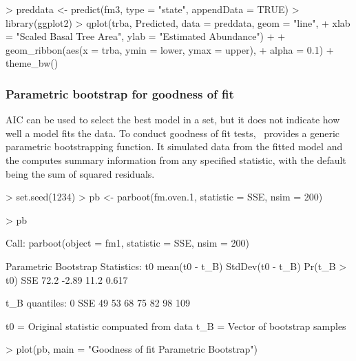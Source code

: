 \documentclass[article,shortnames]{jss}
\newcommand{\um}{\pkg{unmarked}}
\begin{document}
\begin{Schunk}
\begin{Sinput}
> preddata <- predict(fm3, type = "state", appendData = TRUE)
> library(ggplot2)
> qplot(trba, Predicted, data = preddata, geom = "line", 
+     xlab = "Scaled Basal Tree Area", ylab = "Estimated Abundance") + 
+     geom_ribbon(aes(x = trba, ymin = lower, ymax = upper), 
+         alpha = 0.1) + theme_bw()
\end{Sinput}
\end{Schunk}



\subsubsection{Parametric bootstrap for goodness of fit}

AIC can be used to select the best model in a set, but it does not indicate
how well a model fits the data.  
To conduct goodness of fit tests, \um\ provides a generic
parametric bootstrapping function.  It simulated data from the fitted
model and the computes summary information from any specified
statistic, with the default being the sum of squared residuals.

\begin{Schunk}
\begin{Sinput}
> set.seed(1234)
> pb <- parboot(fm.oven.1, statistic = SSE, nsim = 200)
\end{Sinput}
\end{Schunk}
\begin{Schunk}
\begin{Sinput}
> pb
\end{Sinput}
\begin{Soutput}
Call: parboot(object = fm1, statistic = SSE, nsim = 200)

Parametric Bootstrap Statistics:
      t0 mean(t0 - t_B) StdDev(t0 - t_B) Pr(t_B > t0)
SSE 72.2          -2.89             11.2        0.617

t_B quantiles:
    0% 2.5% 25% 50% 75% 97.5% 100%
SSE 49   53  68  75  82    98  109

t0 = Original statistic compuated from data
t_B = Vector of bootstrap samples
\end{Soutput}
\end{Schunk}

\begin{Schunk}
\begin{Sinput}
> plot(pb, main = "Goodness of fit Parametric Bootstrap")
\end{Sinput}
\end{Schunk}
\end{document}
